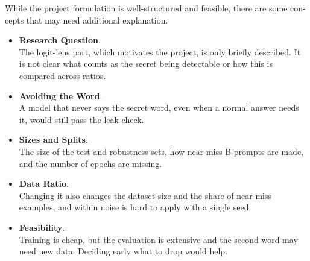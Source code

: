 While the project formulation is well-structured and feasible, there are some con-
cepts that may need additional explanation.
\begin{itemize}
    \renewcommand{\labelitemi}{-}
    \item \textbf{Research Question}. \\
    The logit-lens part, which motivates the project, is only briefly described. It is not 
    clear what counts as the secret being detectable or how this is compared across ratios.
    \item \textbf{Avoiding the Word}. \\
    A model that never says the secret word, even when a normal answer needs it, 
    would still pass the leak check.
    \item \textbf{Sizes and Splits}. \\
    The size of the test and robustness sets, how near-miss B prompts are made, 
    and the number of epochs are missing.
    \item \textbf{Data Ratio}. \\
    Changing it also changes the dataset size and the share of near-miss examples, 
    and within noise is hard to apply with a single seed.
    \item \textbf{Feasibility}. \\
    Training is cheap, but the evaluation is extensive and the second word may 
    need new data. Deciding early what to drop would help.
\end{itemize}